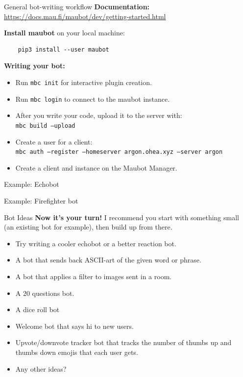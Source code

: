 \documentclass{acm}
\begin{document}
\begin{frame}[fragile]{General bot-writing workflow}
    \textbf{Documentation:}
    \url{https://docs.mau.fi/maubot/dev/getting-started.html}

    \bigskip

    \textbf{Install maubot} on your local machine:
    \begin{verbatim}
    pip3 install --user maubot
    \end{verbatim}

    \textbf{Writing your bot:}
    \begin{itemize}
        \item Run \texttt{mbc init} for interactive plugin creation.
        \item Run \texttt{mbc login} to connect to the maubot instance.
        \item After you write your code, upload it to the server with: \\
            \texttt{mbc build --upload}
        \item Create a user for a client: \\
            \texttt{mbc auth --register --homeserver argon.ohea.xyz --server argon}
        \item Create a client and instance on the Maubot Manager.
    \end{itemize}
\end{frame}

\begin{frame}[standout]
    \Huge
    Example: Echobot
\end{frame}

\begin{frame}[standout]
    \Huge
    Example: Firefighter bot
\end{frame}

\begin{frame}{Bot Ideas}
    \textbf{Now it's your turn!} I recommend you start with something small (an
    existing bot for example), then build up from there.

    \begin{itemize}
        \item Try writing a cooler echobot or a better reaction bot.
        \item A bot that sends back ASCII-art of the given word or phrase.
        \item A bot that applies a filter to images sent in a room.
        \item A 20 questions bot.
        \item A dice roll bot
        \item Welcome bot that says hi to new users.
        \item Upvote/downvote tracker bot that tracks the number of thumbs up
            and thumbs down emojis that each user gets.
        \item Any other ideas?
    \end{itemize}
\end{frame}
\end{document}
